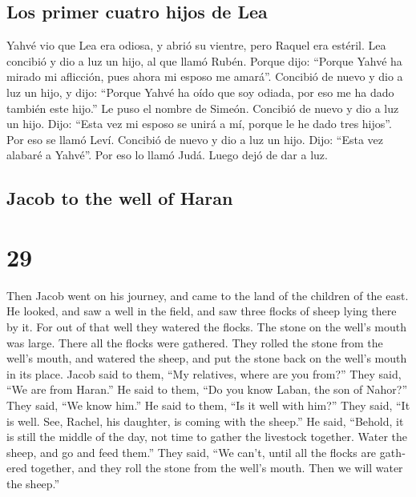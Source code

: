 \begin{paracol}{2}
\hypertarget{los-primer-cuatro-hijos-de-lea}{%
\subsection{Los primer cuatro hijos de
Lea}\label{los-primer-cuatro-hijos-de-lea}}

 Yahvé vio que Lea era odiosa, y abrió su vientre, pero
Raquel era estéril.  Lea concibió y dio a luz un hijo, al
que llamó Rubén. Porque dijo: ``Porque Yahvé ha mirado mi aflicción,
pues ahora mi esposo me amará''.  Concibió de nuevo y dio
a luz un hijo, y dijo: ``Porque Yahvé ha oído que soy odiada, por eso me
ha dado también este hijo.'' Le puso el nombre de Simeón.
 Concibió de nuevo y dio a luz un hijo. Dijo: ``Esta vez
mi esposo se unirá a mí, porque le he dado tres hijos''. Por eso se
llamó Leví.  Concibió de nuevo y dio a luz un hijo. Dijo:
``Esta vez alabaré a Yahvé''. Por eso lo llamó Judá. Luego dejó de dar a
luz.

\switchcolumn
\begin{otherlanguage}{english}

\hypertarget{jacob-to-the-well-of-haran}{%
\subsection{Jacob to the well of
Haran}\label{jacob-to-the-well-of-haran}}

\hypertarget{section-57}{%
\section{29}\label{section-57}}

 Then Jacob went on his journey, and came to the land of
the children of the east.  He looked, and saw a well in
the field, and saw three flocks of sheep lying there by it. For out of
that well they watered the flocks. The stone on the well's mouth was
large.  There all the flocks were gathered. They rolled
the stone from the well's mouth, and watered the sheep, and put the
stone back on the well's mouth in its place.  Jacob said
to them, ``My relatives, where are you from?'' They said, ``We are from
Haran.''  He said to them, ``Do you know Laban, the son of
Nahor?'' They said, ``We know him.''  He said to them,
``Is it well with him?'' They said, ``It is well. See, Rachel, his
daughter, is coming with the sheep.''  He said, ``Behold,
it is still the middle of the day, not time to gather the livestock
together. Water the sheep, and go and feed them.''  They
said, ``We can't, until all the flocks are gathered together, and they
roll the stone from the well's mouth. Then we will water the sheep.''


\end{otherlanguage}
\end{paracol}
